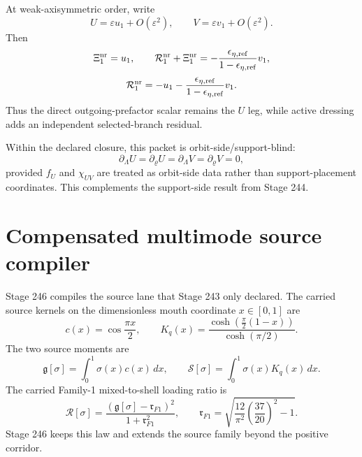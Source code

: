 At weak-axisymmetric order, write
\begin{equation}
\label{eq:part08-stage245-first-order-uv}
U=\varepsilon u_1+O(\varepsilon^2),
\qquad
V=\varepsilon v_1+O(\varepsilon^2).
\end{equation}
Then
\begin{equation}
\label{eq:part08-stage245-xi-r-first}
\Xi_1^{\rm nr}=u_1,
\qquad
\mathcal R_1^{\rm nr}+\Xi_1^{\rm nr}
=-\frac{\epsilon_{\eta,{\rm ref}}}{1-\epsilon_{\eta,{\rm ref}}}v_1,
\end{equation}
\begin{equation}
\label{eq:part08-stage245-r-first}
\mathcal R_1^{\rm nr}
=
-u_1-
\frac{\epsilon_{\eta,{\rm ref}}}{1-\epsilon_{\eta,{\rm ref}}}v_1.
\end{equation}
Thus the direct outgoing-prefactor scalar remains the \(U\) leg, while active dressing adds an independent selected-branch residual.

Within the declared closure, this packet is orbit-side/support-blind:
\begin{equation}
\label{eq:part08-stage245-support-blind}
\partial_\Lambda U=
\partial_\varrho U=
\partial_\Lambda V=
\partial_\varrho V=0,
\end{equation}
provided \(f_U\) and \(\chi_{UV}\) are treated as orbit-side data rather than support-placement coordinates.  This complements the support-side result from Stage 244.

\section{Compensated multimode source compiler}
\label{sec:part08_relaxed_branch:compensated-multimode-source-compiler}

Stage 246 compiles the source lane that Stage 243 only declared.  The carried source kernels on the dimensionless mouth coordinate \(x\in[0,1]\) are
\begin{equation}
\label{eq:part08-stage246-source-kernels}
c(x)=\cos\frac{\pi x}{2},
\qquad
K_q(x)=\frac{\cosh\left(\frac\pi2(1-x)\right)}{\cosh(\pi/2)}.
\end{equation}
The two source moments are
\begin{equation}
\label{eq:part08-stage246-source-moments-def}
\mathfrak g[\sigma]=\int_0^1\sigma(x)c(x)\,dx,
\qquad
\mathcal S[\sigma]=\int_0^1\sigma(x)K_q(x)\,dx.
\end{equation}
The carried Family-1 mixed-to-shell loading ratio is
\begin{equation}
\label{eq:part08-stage246-rsigma-def}
\mathcal R[\sigma]
=
\frac{(\mathfrak g[\sigma]-\mathfrak r_{F1})^2}{1+\mathfrak r_{F1}^2},
\qquad
\mathfrak r_{F1}=
\sqrt{\frac{12}{\pi^2}\left(\frac{37}{20}\right)^2-1}.
\end{equation}
Stage 246 keeps this law and extends the source family beyond the positive corridor.

